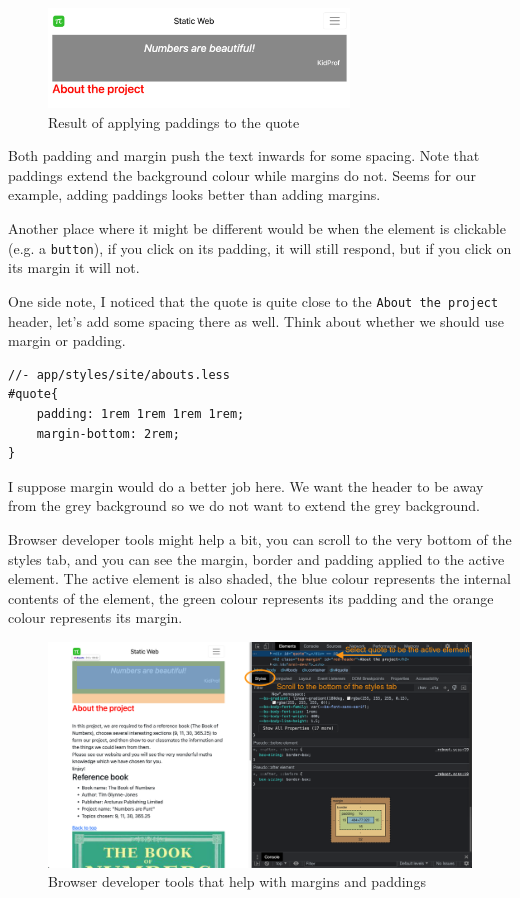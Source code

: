 \begin{figure}[H]
\centering
\includegraphics[width=8cm]{images/chn6-quote-padding.png}
\caption{Result of applying paddings to the quote}
\end{figure}

Both padding and margin push the text inwards for some spacing. Note that paddings extend the background colour while margins do not. Seems for our example, adding paddings looks better than adding margins.

Another place where it might be different would be when the element is clickable (e.g. a \texttt{button}), if you click on its padding, it will still respond, but if you click on its margin it will not.
\vspace{6mm}

One side note, I noticed that the quote is quite close to the \texttt{About the project} header, let's add some spacing there as well. Think about whether we should use margin or padding.

\begin{lstlisting}[language=pug]
//- app/styles/site/abouts.less
#quote{
    padding: 1rem 1rem 1rem 1rem;
    margin-bottom: 2rem;
}
\end{lstlisting}

I suppose margin would do a better job here. We want the header to be away from the grey background so we do not want to extend the grey background. 
\vspace{6mm}

Browser developer tools might help a bit, you can scroll to the very bottom of the styles tab, and you can see the margin, border and padding applied to the active element. The active element is also shaded, the blue colour represents the internal contents of the element, the green colour represents its padding and the orange colour represents its margin.

\begin{figure}[h]
\centering
\includegraphics[width=15cm]{images/chn6-quote-chrome.png}
\caption{Browser developer tools that help with margins and paddings}
\end{figure}

